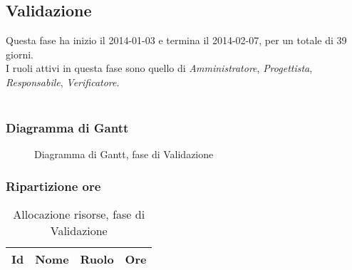 	
	\subsection{Validazione}
	
Questa fase ha inizio il 2014-01-03 e termina il 2014-02-07, per un totale di 39 giorni. \\
I ruoli attivi in questa fase sono quello di \textit{Amministratore}, \textit{Progettista}, \textit{Responsabile}, \textit{Verificatore}. \\ \\

\subsubsection{Diagramma di Gantt}

\begin{figure}[H]
\centering

	

\caption{Diagramma di Gantt, fase di Validazione}
\end{figure}

\subsubsection{Ripartizione ore}

\begin{table}[H]
\begin{adjustwidth}{-4cm}{-4cm}
	\centering
	\begin{tabular}{ l l l c  }
	\hline
	\multicolumn{1}{c}{\textbf{Id}} & 
	\multicolumn{1}{c}{\textbf{Nome}} & 
	\multicolumn{1}{c}{\textbf{Ruolo}}& 
	\multicolumn{1}{c}{\textbf{Ore}} \\
	\hline
	
		

	\end{tabular}
	\caption{Allocazione risorse, fase di Validazione}
\end{adjustwidth}
\end{table}	
	
	
